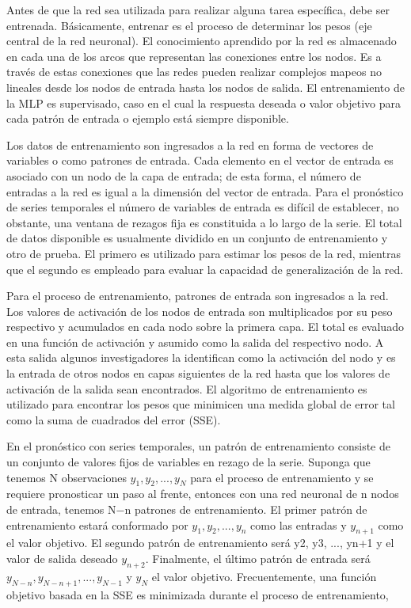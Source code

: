 \hspace*{0.4 cm} Antes de que la red sea utilizada para realizar alguna tarea espec\'ifica, debe ser entrenada. B\'asicamente, entrenar es el proceso de determinar los pesos (eje central de la red neuronal). El conocimiento aprendido por la red es almacenado en cada una de los arcos que representan las conexiones entre los nodos. Es a trav\'es de estas conexiones que las redes pueden realizar complejos mapeos no lineales desde los nodos de entrada hasta los nodos de salida. El entrenamiento de la MLP es supervisado, caso en el cual la respuesta deseada o valor objetivo para cada patr\'on de entrada o ejemplo est\'a siempre disponible.

\hspace*{0.4 cm} Los datos de entrenamiento son ingresados a la red en forma de vectores de variables o como patrones de entrada. Cada elemento en el vector de entrada es asociado con un nodo de la capa de entrada; de esta forma, el n\'umero de entradas a la red es igual a la dimensi\'on del vector de entrada. Para el pron\'ostico de series temporales el n\'umero de variables de entrada es dif\'icil de establecer, no obstante, una ventana de rezagos fija es constituida a lo largo de la serie. El total de datos disponible es usualmente dividido en un conjunto de entrenamiento y otro de prueba. El primero es utilizado para estimar los pesos de la red, mientras que el segundo es empleado para evaluar la capacidad de generalizaci\'on de la red.


\hspace*{0.4 cm} Para el proceso de entrenamiento, patrones de entrada son ingresados a la red. Los valores de activaci\'on de los nodos de entrada son multiplicados por su peso respectivo y acumulados en cada nodo sobre la primera capa. El total es evaluado en una funci\'on de activaci\'on y asumido como la salida del respectivo nodo. A esta salida algunos investigadores la identifican como la activaci\'on del nodo y es la entrada de otros nodos en capas siguientes de la red hasta que los valores de activaci\'on de la salida sean encontrados. El algoritmo de entrenamiento es utilizado para encontrar los pesos que minimicen una medida global de error tal como la suma de cuadrados del error (SSE).


\hspace*{0.4 cm} En el pron\'ostico con series temporales, un patr\'on de entrenamiento consiste de un conjunto de valores fijos de variables en rezago de la serie. Suponga que tenemos N observaciones $y_{1}, y_{2}, ..., y_{N}$ para el proceso de entrenamiento y se requiere pronosticar un paso al frente, entonces con una red neuronal de n nodos de entrada, tenemos N−n patrones de entrenamiento. El primer patr\'on de entrenamiento estar\'a conformado por $y_{1}, y_{2}, ..., y_{n}$ como las entradas y $y_{n+1}$ como el valor objetivo. El segundo patr\'on de entrenamiento ser\'a y2, y3, ..., yn+1 y el valor de salida deseado $y_{n+2}$. Finalmente, el \'ultimo patr\'on de entrada ser\'a $y_{N-n}, y_{N-n+1}, ..., y_{N-1}$ y $y_{N}$ el valor objetivo. Frecuentemente, una funci\'on objetivo basada en la SSE es minimizada durante el proceso de entrenamiento,

